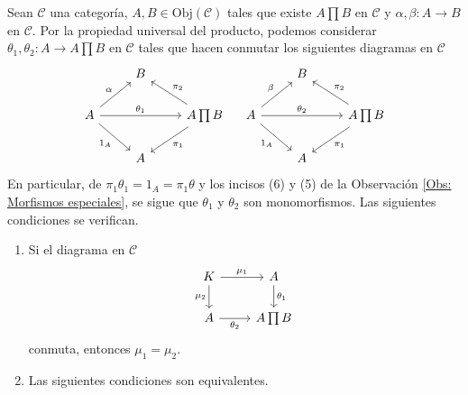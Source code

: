 \documentclass[tesis]{subfiles}
\begin{document}
\begin{Prop}\label{Mendoza-1.8.5,1.8.7}
    Sean $\mathscr{C}$ una categoría, $A,B\in\text{Obj}(\mathscr{C})$ tales que existe $A\prod B$ en $\mathscr{C}$ y $\alpha,\beta:A\to B$ en $\mathscr{C}$. Por la propiedad universal del producto, podemos considerar $\theta_1,\theta_2:A\to A\prod B$ en $\mathscr{C}$ tales que hacen conmutar los siguientes diagramas en $\mathscr{C}$
    \begin{equation}\label{eq: Mendoza-1.8.7-1}
        \begin{tikzcd}
            &B \\
            A \arrow[]{ur}[]{\alpha} \arrow[]{dr}[swap]{1_A} \arrow[]{rr}[]{\theta_1} &&A\prod B \arrow[]{ul}[swap]{\pi_2} \arrow[]{dl}[]{\pi_1} \\
                                                                                      &A
        \end{tikzcd}
        \quad
        \begin{tikzcd}
            &B \\
            A \arrow[]{ur}[]{\beta} \arrow[]{dr}[swap]{1_A} \arrow[]{rr}[]{\theta_2} &&A\prod B \arrow[]{ul}[swap]{\pi_2} \arrow[]{dl}[]{\pi_1} \\
                                                                                      &A
        \end{tikzcd}
    \end{equation}
    En particular, de $\pi_1\theta_1 = 1_A = \pi_1\theta$ y los incisos (6) y (5) de la Observación \ref{Obs: Morfismos especiales}, se sigue que $\theta_1$ y $\theta_2$ son monomorfismos. Las siguientes condiciones se verifican.

    \begin{enumerate}[label=(\alph*)]
    
        \item Si el diagrama en $\mathscr{C}$
            \begin{equation}\label{eq: Mendoza-1.8.7-2}
                \begin{tikzcd}
                    K \arrow[]{d}[swap]{\mu_2} \arrow[]{r}[]{\mu_1} &A \arrow[]{d}[]{\theta_1} \\
                    A \arrow[]{r}[swap]{\theta_2} &A\prod B
                \end{tikzcd}
            \end{equation}
            conmuta, entonces $\mu_1 = \mu_2$.
            
        \item Las siguientes condiciones son equivalentes.


\end{enumerate}
\end{Prop}
\end{document}
